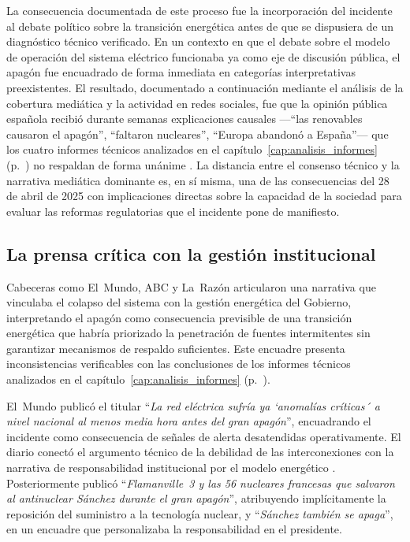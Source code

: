 La consecuencia documentada de este proceso fue la incorporación del
incidente al debate político sobre la transición energética antes de
que se dispusiera de un diagnóstico técnico verificado. En un contexto
en que el debate sobre el modelo de operación del sistema eléctrico
funcionaba ya como eje de discusión pública, el apagón fue encuadrado
de forma inmediata en categorías interpretativas preexistentes. El
resultado, documentado a continuación mediante el análisis de la
cobertura mediática y la actividad en redes sociales, fue que la
opinión pública española recibió durante semanas explicaciones
causales ---``las renovables causaron el apagón'', ``faltaron
nucleares'', ``Europa abandonó a España''--- que los cuatro informes
técnicos analizados en el capítulo~\ref{cap:analisis_informes}
(p.~\pageref{cap:analisis_informes}) no respaldan de forma unánime
\cite{gobierno2025,ree2025,entsoe2025}. La distancia entre el consenso
técnico y la narrativa mediática dominante es, en sí misma, una de
las consecuencias del 28 de abril de 2025 con implicaciones directas
sobre la capacidad de la sociedad para evaluar las reformas
regulatorias que el incidente pone de manifiesto.

\subsection*{La prensa crítica con la gestión institucional}

Cabeceras como El~Mundo, ABC y La~Razón articularon una narrativa que
vinculaba el colapso del sistema con la gestión energética del
Gobierno, interpretando el apagón como consecuencia previsible de una
transición energética que habría priorizado la penetración de fuentes
intermitentes sin garantizar mecanismos de respaldo suficientes. Este
encuadre presenta inconsistencias verificables con las conclusiones de
los informes técnicos analizados en el
capítulo~\ref{cap:analisis_informes}
(p.~\pageref{cap:analisis_informes}).

El~Mundo publicó el titular ``\textit{La red eléctrica sufría ya `anomalías
críticas´$ $  a nivel nacional al menos media hora antes del gran apagón}'',
encuadrando el incidente como consecuencia de señales de alerta
desatendidas operativamente. El diario conectó el argumento técnico
de la debilidad de las interconexiones con la narrativa de
responsabilidad institucional por el modelo energético
\cite{mitceepr2025}. Posteriormente publicó ``\textit{Flamanville~3 y las 56
nucleares francesas que salvaron al antinuclear Sánchez durante el
gran apagón}'', atribuyendo implícitamente la reposición del suministro
a la tecnología nuclear, y ``\textit{Sánchez también se apaga}'', en un
encuadre que personalizaba la responsabilidad en el presidente.

